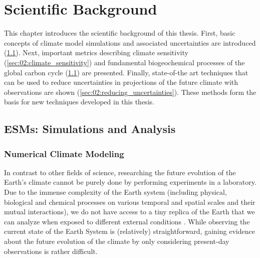 


\chapter{Scientific Background}
\label{ch:02:scientific_background}

This chapter introduces the scientific background of this thesis. First, basic
concepts of climate model simulations and associated uncertainties are
introduced (\cref{sec:02:esms}). Next, important metrics describing climate
sensitivity (\cref{sec:02:climate_sensitivity}) and fundamental biogeochemical
processes of the global carbon cycle (\cref{sec:02:esms}) are presented.
Finally, state-of-the art techniques that can be used to reduce uncertainties
in projections of the future climate with observations are shown
(\cref{sec:02:reducing_uncertainties}). These methods form the basis for new
techniques developed in this thesis.


\section{\aclp{ESM}: Simulations and Analysis}
\label{sec:02:esms}


\subsection{Numerical Climate Modeling}
\label{subsec:02:numerical_climate_modeling}

In contrast to other fields of science, researching the future evolution of the
Earth's climate cannot be purely done by performing experiments in a
laboratory. Due to the immense complexity of the Earth system (including
physical, biological and chemical processes on various temporal and spatial
scales and their mutual interactions), we do not have access to a tiny replica
of the Earth that we can analyze when exposed to different external conditions
\autocite{Flato2011}. While observing the current state of the Earth System is
(relatively) straightforward, gaining evidence about the future evolution of
the climate by only considering present-day observations is rather difficult.

